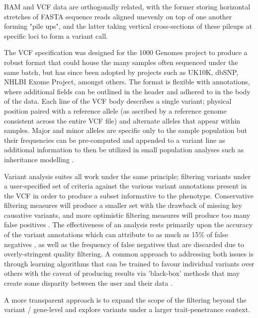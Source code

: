 \documentclass[twocolumn]{bmcart}%
\newcounter{changeCount}
\newcommand{\changes}[1]{
		\stepcounter{changeCount}
		{\tiny\bf\color{violet}\arabic{changeCount}}
		{\color{red} #1}
	}
\newcommand{\changes}[1]{#1}
\begin{document}
BAM and VCF data are orthogonally related, with the former storing horizontal stretches of FASTA sequence reads aligned unevenly on top of one another forming "pile ups", and the latter taking vertical cross-sections of these pileups at specific loci to form a variant call.

The VCF specification was designed for the 1000 Genomes project to produce a robust format that could house the many samples often sequenced under the same batch, but has since been adopted by projects such as UK10K, dbSNP, NHLBI Exome Project, amongst others. The format is flexible with annotations, where additional fields can be outlined in the header and adhered to in the body of the data. Each line of the VCF body describes a single variant; physical position paired with a reference allele (as ascribed by a reference genome consistent across the entire VCF file) and alternate alleles that appear within samples. Major and minor alleles are specific only to the sample population but their frequencies can be pre-computed and appended to a variant line as additional information to then be utilized in small population analyses such as inheritance modelling \cite{danecek2011variant}.

Variant analysis suites all work under the same principle; filtering variants under a user-specified set of criteria against the various variant annotations present in the VCF in order to produce a subset informative to the phenotype. \changes{Conservative filtering measures will produce a smaller set with the drawback of missing key causative variants, and more optimistic filtering measures will produce too many false positives}. The effectiveness of an analysis rests primarily upon the accuracy of the variant annotations which can attribute to as much as 15\% of false negatives \cite{warden2014detailed}, as well as the frequency of false negatives that are discarded due to overly-stringent quality filtering. A common approach to addressing both issues is through learning algorithms that can be trained to favour individual variants over others with the caveat of producing results via 'black-box' methods that may create some disparity between the user and their data \cite{pabinger2014survey}.

A more transparent approach is to expand the scope of the filtering beyond the variant / gene-level and explore variants under a larger trait-penetrance context.%
\end{document}

